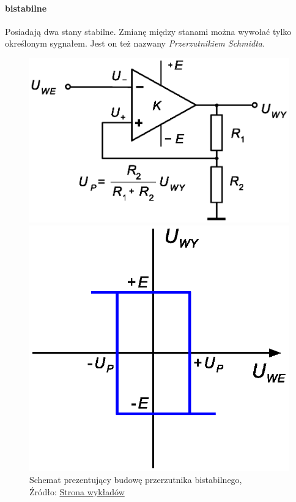 \documentclass{article}
\begin{document}
        \paragraph{bistabilne}
          \mbox{}\newline
          Posiadają dwa stany stabilne. Zmianę między stanami można wywołać tylko określonym sygnałem. Jest on też nazwany \textit{Przerzutnikiem Schmidta}.

          \begin{figure}[!ht]
            \begin{minipage}{.5\textwidth}
              \centering
              \includegraphics[scale=0.70]{grafiki/Schmidt.eps}
              \caption{Schemat prezentujący budowę przerzutnika bistabilnego,
              \\Źródło: \href{https://spe.if.uj.edu.pl/literatura}{Strona wykładów}}
              \label{fig6:Schmidt}
            \end{minipage}
            \begin{minipage}{.5\textwidth}
              \centering
              \includegraphics[scale=0.70]{grafiki/petla_histerezy.eps}

\end{minipage}
\end{figure}
\end{document}
